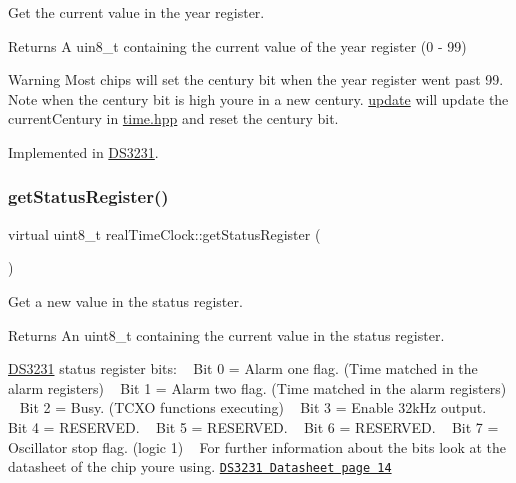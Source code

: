 Get the current value in the year register. 

\begin{DoxyReturn}{Returns}
A uin8\+\_\+t containing the current value of the year register (0 -\/ 99) 
\end{DoxyReturn}
\begin{DoxyWarning}{Warning}
Most chips will set the century bit when the year register went past 99. Note when the century bit is high you\textquotesingle{}re in a new century. \mbox{\hyperlink{classreal_time_clock_afb5132ca3cbe80552a88041cead0a2b3}{update}} will update the current\+Century in \mbox{\hyperlink{time_8hpp_source}{time.\+hpp}} and reset the century bit. 
\end{DoxyWarning}


Implemented in \mbox{\hyperlink{class_d_s3231_a28a340b10b045ad1e8b94532a57c3759}{D\+S3231}}.

\mbox{\label{classreal_time_clock_a38dcc51b0b30a5e480ea7f18f2c792ba}} 
\subsubsection{\texorpdfstring{get\+Status\+Register()}{getStatusRegister()}}
{\footnotesize\ttfamily virtual uint8\+\_\+t real\+Time\+Clock\+::get\+Status\+Register (\begin{DoxyParamCaption}{ }\end{DoxyParamCaption})\hspace{0.3cm}{\ttfamily [pure virtual]}}



Get a new value in the status register. 

\begin{DoxyReturn}{Returns}
An uint8\+\_\+t containing the current value in the status register.
\end{DoxyReturn}
\mbox{\hyperlink{class_d_s3231}{D\+S3231}} status register bits\+: ~\newline
 Bit 0 = Alarm one flag. (Time matched in the alarm registers) ~\newline
 Bit 1 = Alarm two flag. (Time matched in the alarm registers) ~\newline
 Bit 2 = Busy. (T\+C\+XO functions executing) ~\newline
 Bit 3 = Enable 32k\+Hz output. ~\newline
 Bit 4 = R\+E\+S\+E\+R\+V\+ED. ~\newline
 Bit 5 = R\+E\+S\+E\+R\+V\+ED. ~\newline
 Bit 6 = R\+E\+S\+E\+R\+V\+ED. ~\newline
 Bit 7 = Oscillator stop flag. (logic 1) ~\newline
 For further information about the bits look at the datasheet of the chip you\textquotesingle{}re using. \href{https://datasheets.maximintegrated.com/en/ds/DS3231.pdf}{\tt D\+S3231 Datasheet page 14} 

